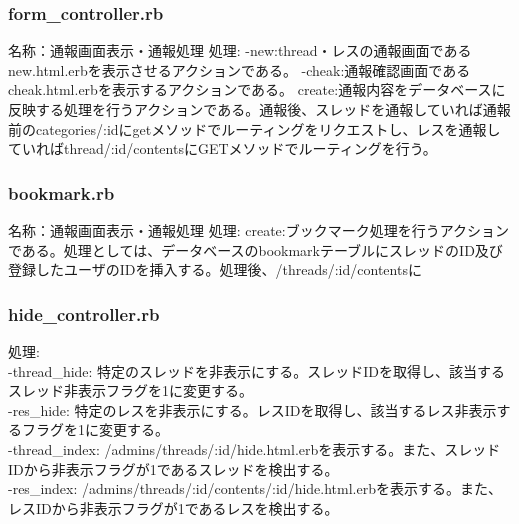 \documentclass[a4j]{jarticle}
\begin{document}
\subsubsection{form\_controller.rb}
\noindent 名称：通報画面表示・通報処理 \newline
処理:\newline
-new:thread・レスの通報画面であるnew.html.erbを表示させるアクションである。
-cheak:通報確認画面であるcheak.html.erbを表示するアクションである。
create:通報内容をデータベースに反映する処理を行うアクションである。通報後、スレッドを通報していれば通報前のcategories/:idにgetメソッドでルーティングをリクエストし、レスを通報していればthread/:id/contentsにGETメソッドでルーティングを行う。



\subsubsection{bookmark.rb}
\noindent 名称：通報画面表示・通報処理 \newline
処理:\newline
create:ブックマーク処理を行うアクションである。処理としては、データベースのbookmarkテーブルにスレッドのID及び登録したユーザのIDを挿入する。処理後、/threads/:id/contentsに


\subsubsection{hide\_controller.rb}
\noindent
処理:\\
-thread\_hide: 特定のスレッドを非表示にする。スレッドIDを取得し、該当するスレッド非表示フラグを1に変更する。\\
-res\_hide: 特定のレスを非表示にする。レスIDを取得し、該当するレス非表示するフラグを1に変更する。\\
-thread\_index: /admins/threads/:id/hide.html.erbを表示する。また、スレッドIDから非表示フラグが1であるスレッドを検出する。\\
-res\_index: /admins/threads/:id/contents/:id/hide.html.erbを表示する。また、レスIDから非表示フラグが1であるレスを検出する。\\
\end{document}
